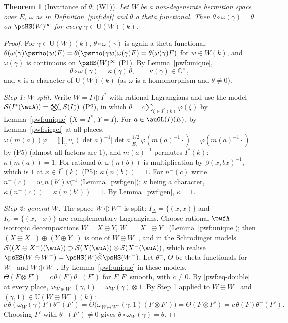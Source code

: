 \documentclass[10pt]{amsart}
\newtheorem{theorem}{Theorem}[section]
\theoremstyle{definition}
\theoremstyle{remark}
\newcommand{\C}{\mathbb C}
\providecommand{\auS}{\mathcal S}
\providecommand{\auU}{\mathrm U}
\begin{document}
\begin{theorem}[Invariance of $\theta$; (W1)]\label{pwf:inv}
Let $W$ be a non-degenerate hermitian space over $E$, $\omega$ as in Definition~\ref{pwf:def} and
$\theta$ a theta functional. Then $\theta\circ\omega(\gamma)=\theta$ on $\psHS(W)^\infty$ for every
$\gamma\in\auU(W)(k)$.
\end{theorem}
\begin{proof}
For $\gamma\in\auU(W)(k)$, $\theta\circ\omega(\gamma)$ is again a theta functional:
$\theta(\omega(\gamma)\psrho(w)F)=\theta(\psrho(\gamma w)\omega(\gamma)F)=\theta(\omega(\gamma)F)$ for
$w\in W(k)$, and $\omega(\gamma)$ is continuous on $\psHS(W)^\infty$ (P1). By Lemma~\ref{pwf:unique},
\begin{equation}\label{pwf:eq-char}
\theta\circ\omega(\gamma)=\kappa(\gamma)\,\theta,\qquad\kappa(\gamma)\in\C^\times,
\end{equation}
and $\kappa$ is a character of $\auU(W)(k)$ (as $\omega$ is a homomorphism and $\theta\ne0$).

\emph{Step 1: $W$ split.} Write $W=I\oplus I^*$ with rational Lagrangians and use the model
$\auS(I^*(\auA))=\bigotimes'_v\auS(I^*_v)$ (P2), in which $\theta=c\sum_{\xi\in I^*(k)}\varphi(\xi)$
by Lemma~\ref{pwf:unique} ($X=I^*$, $Y=I$). For $a\in\auGL(I)(E)$, by Lemma~\ref{pwf:siegel} at all
places, $\omega(m(a))\varphi=\prod_v\upsilon_v(\det a)^{-1}|\det a|_{E_v}^{1/2}\,\varphi(m(a)^{-1}\cdot)
=\varphi(m(a)^{-1}\cdot)$ by (P5) (almost all factors are $1$), and $m(a)^{-1}$ permutes $I^*(k)$:
$\kappa(m(a))=1$. For rational $b$, $\omega(n(b))$ is multiplication by $\beta(x,bx)^{-1}$, which is
$1$ at $x\in I^*(k)$ (P5): $\kappa(n(b))=1$. For $n^-(c)$ write $n^-(c)=w_\varepsilon n(b')
w_\varepsilon^{-1}$ (Lemma~\ref{pwf:gen}); $\kappa$ being a character, $\kappa(n^-(c))=\kappa(n(b'))=1$.
By Lemma~\ref{pwf:gen}, $\kappa=1$.

\emph{Step 2: general $W$.} The space $W\oplus W^-$ is split: $I_\Delta=\{(x,x)\}$ and
$I_\nabla=\{(x,-x)\}$ are complementary Lagrangians. Choose rational $\pwfA$-isotropic
decompositions $W=X\oplus Y$, $W^-=X^-\oplus Y^-$ (Lemma~\ref{pwf:unique}); then $(X\oplus X^-)\oplus
(Y\oplus Y^-)$ is one of $W\oplus W^-$, and in the Schr\"odinger models
$\auS((X\oplus X^-)(\auA))\supset\auS(X(\auA))\otimes\auS(X^-(\auA))$, which realise
$\psHS(W\oplus W^-)=\psHS(W)\widehat\otimes\psHS(W^-)$. Let $\theta^-$, $\Theta$ be theta functionals
for $W^-$ and $W\oplus W^-$. By Lemma~\ref{pwf:unique} in these models, $\Theta(F\otimes F')=
c\,\theta(F)\theta^-(F')$ for $F,F'$ smooth, with $c\ne0$. By \eqref{pwf:eq-double} at every place,
$\omega_{W\oplus W^-}(\gamma,1)=\omega_W(\gamma)\otimes1$. By Step 1 applied to $W\oplus W^-$ and
$(\gamma,1)\in\auU(W\oplus W^-)(k)$:
\[
c\,\theta(\omega_W(\gamma)F)\theta^-(F')=\Theta\bigl(\omega_{W\oplus W^-}(\gamma,1)(F\otimes F')\bigr)
=\Theta(F\otimes F')=c\,\theta(F)\theta^-(F').
\]
Choosing $F'$ with $\theta^-(F')\ne0$ gives $\theta\circ\omega_W(\gamma)=\theta$.
\end{proof}
\end{document}
